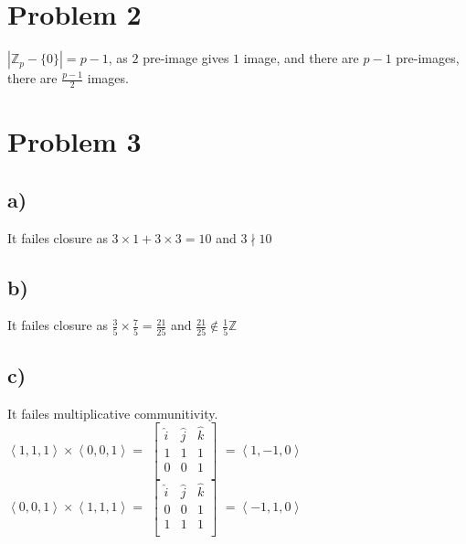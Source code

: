 \documentclass{article}
\begin{document}
\section*{Problem 2}
\(|\mathbb{Z}_p-\{0\}|=p-1\), as \(2\) pre-image gives \(1\) image, and there are \(p-1\) pre-images, there are \(\frac{p-1}{2}\) images.
\section*{Problem 3}
\subsection*{a)}
It failes closure as \(3\times 1 + 3\times 3=10\) and \(3\nmid 10\)
\subsection*{b)}
It failes closure as \(\displaystyle \frac{3}{5}\times \frac{7}{5}= \frac{21}{25}\) and \(\displaystyle \frac{21}{25}\notin \frac{1}{5}\mathbb{Z}\)
\subsection*{c)}
It failes multiplicative communitivity.\\
\(\left<1,1,1\right>\times \left<0,0,1  \right>= \)
$\begin{bmatrix}
    \hat{i}&\hat{j}&\hat{k}\\
    1&1&1\\
    0&0&1\\
\end{bmatrix}$
\(=\left<1,-1,0\right>\)\\
\(\left<0,0,1\right>\times \left<1,1,1  \right>= \)
$\begin{bmatrix}
    \hat{i}&\hat{j}&\hat{k}\\
    0&0&1\\
    1&1&1\\
\end{bmatrix}$
\(=\left<-1,1,0\right>\)

\end{document}
